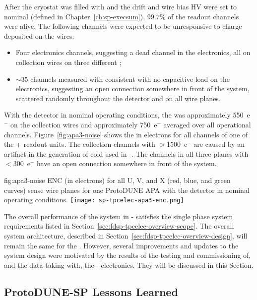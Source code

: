 After the cryostat was filled with  and the drift and wire bias HV were set to nominal (defined in Chapter~\ref{ch:sp-execsum}), 99.7\% of the  readout channels were alive. The following channels were expected to be unresponsive to charge deposited on the wires:
\begin{itemize}
\item Four electronics channels, suggesting a dead channel in the electronics, all on collection wires on three different ;
\item $\sim$35 channels measured with  consistent with no capacitive load on the  electronics, suggesting an open connection somewhere in front of the  system, scattered randomly throughout the detector and on all wire planes.
\end{itemize}
With the detector in nominal operating conditions, the  was approximately 550~e$^-$ on the collection wires and approximately 750~e$^-$ averaged over all operational channels. Figure~\ref{fig:apa3-noise} shows the  in electrons for all channels of one of the + readout units. The collection channels with $>$1500~e$^-$ are caused by an artifact in the generation of cold   used in -. The channels in all three planes with $<$300~e$^-$ have an open connection somewhere in front of the  system.

\begin{dunefigure}
{fig:apa3-noise}
{ENC (in electrons) for all U, V, and X (red, blue, and green curves) sense wire planes for one ProtoDUNE APA with the detector in nominal operating conditions.}
\texttt{[image: sp-tpcelec-apa3-enc.png]}
\end{dunefigure}

The overall performance of the  system in - satisfies the  single phase   system requirements listed in Section~\ref{sec:fdsp-tpcelec-overview-scope}. The overall system architecture, described in Section~\ref{sec:fdsp-tpcelec-overview-design}, will remain the same for the  . However, several improvements and updates to the  system design were motivated by the results of the testing and commissioning of, and the data-taking with, the - electronics. They will be discussed in this Section.

\subsection{ProtoDUNE-SP Lessons Learned}
\label{sec:fdsp-tpcelec-overview-lessonslearned}

